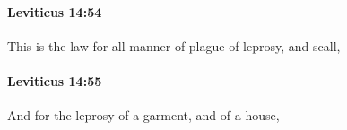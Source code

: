 		\paragraph{Leviticus 14:54} %
			\label{LEVITICUS-14-54}

			This is the law for all manner of plague of leprosy, and scall,


		\paragraph{Leviticus 14:55} %
			\label{LEVITICUS-14-55}

			And for the leprosy of a garment, and of a house,


